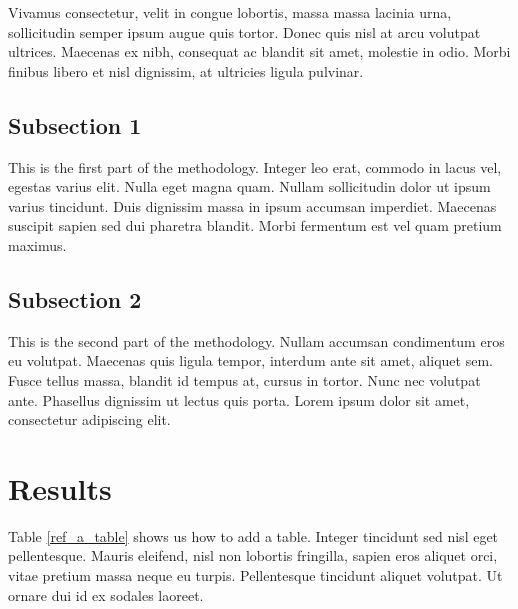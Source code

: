 \documentclass[12pt,a4paper,]{report}
\begin{document}
Vivamus consectetur, velit in congue lobortis, massa massa lacinia urna,
sollicitudin semper ipsum augue quis tortor. Donec quis nisl at arcu
volutpat ultrices. Maecenas ex nibh, consequat ac blandit sit amet,
molestie in odio. Morbi finibus libero et nisl dignissim, at ultricies
ligula pulvinar.

\subsection{Subsection 1}\label{subsection-1-1}

This is the first part of the methodology. Integer leo erat, commodo in
lacus vel, egestas varius elit. Nulla eget magna quam. Nullam
sollicitudin dolor ut ipsum varius tincidunt. Duis dignissim massa in
ipsum accumsan imperdiet. Maecenas suscipit sapien sed dui pharetra
blandit. Morbi fermentum est vel quam pretium maximus.

\subsection{Subsection 2}\label{subsection-2-2}

This is the second part of the methodology. Nullam accumsan condimentum
eros eu volutpat. Maecenas quis ligula tempor, interdum ante sit amet,
aliquet sem. Fusce tellus massa, blandit id tempus at, cursus in tortor.
Nunc nec volutpat ante. Phasellus dignissim ut lectus quis porta. Lorem
ipsum dolor sit amet, consectetur adipiscing elit.

\section{Results}\label{results-3}

Table \ref{ref_a_table} shows us how to add a table. Integer tincidunt
sed nisl eget pellentesque. Mauris eleifend, nisl non lobortis
fringilla, sapien eros aliquet orci, vitae pretium massa neque eu
turpis. Pellentesque tincidunt aliquet volutpat. Ut ornare dui id ex
sodales laoreet.

\newpage
\end{document}

